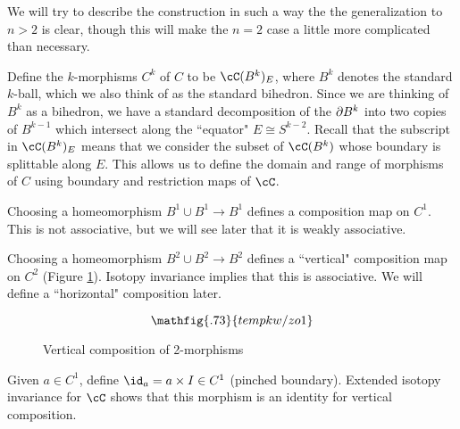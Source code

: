 We will try to describe the construction in such a way the the generalization to $n>2$ is clear,
though this will make the $n=2$ case a little more complicated than necessary.


Define the $k$-morphisms $C^k$ of $C$ to be $\cC(B^k)_E$, where $B^k$ denotes the standard
$k$-ball, which we also think of as the standard bihedron.
Since we are thinking of $B^k$ as a bihedron, we have a standard decomposition of the $\partial B^k$
into two copies of $B^{k-1}$ which intersect along the ``equator" $E \cong S^{k-2}$.
Recall that the subscript in $\cC(B^k)_E$ means that we consider the subset of $\cC(B^k)$
whose boundary is splittable along $E$.
This allows us to define the domain and range of morphisms of $C$ using
boundary and restriction maps of $\cC$.

Choosing a homeomorphism $B^1\cup B^1 \to B^1$ defines a composition map on $C^1$.
This is not associative, but we will see later that it is weakly associative.

Choosing a homeomorphism $B^2\cup B^2 \to B^2$ defines a ``vertical" composition map 
on $C^2$ (Figure \ref{fzo1}).
Isotopy invariance implies that this is associative.
We will define a ``horizontal" composition later.

\begin{figure}[t]
\begin{equation*}
\mathfig{.73}{tempkw/zo1}
\end{equation*}
\caption{Vertical composition of 2-morphisms}
\label{fzo1}
\end{figure}

Given $a\in C^1$, define $\id_a = a\times I \in C^1$ (pinched boundary).
Extended isotopy invariance for $\cC$ shows that this morphism is an identity for 
vertical composition.

